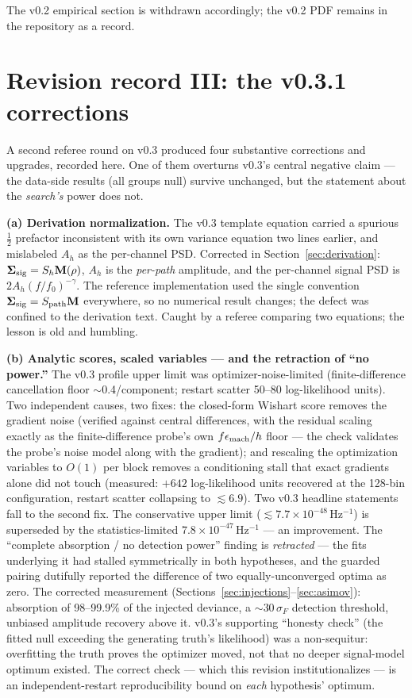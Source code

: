 \documentclass[11pt]{article}
\newcommand{\Ah}{A_h}
\newcommand{\Sh}{S_h}
\begin{document}
The v0.2 empirical section is withdrawn accordingly; the v0.2 PDF remains in the repository as a record.

\section{Revision record III: the v0.3.1 corrections}
\label{app:revision31}

A second referee round on v0.3 produced four substantive corrections and upgrades, recorded here. One of them overturns v0.3's central negative claim --- the data-side results (all groups null) survive unchanged, but the statement about the \emph{search's} power does not.

\textbf{(a) Derivation normalization.} The v0.3 template equation carried a spurious $\tfrac12$ prefactor inconsistent with its own variance equation two lines earlier, and mislabeled $\Ah$ as the per-channel PSD. Corrected in Section~\ref{sec:derivation}: $\bm{\Sigma}_{\rm sig} = \Sh \mathbf{M}(\rho)$, $\Ah$ is the \emph{per-path} amplitude, and the per-channel signal PSD is $2\Ah(f/f_0)^{-\gamma}$. The reference implementation used the single convention $\bm{\Sigma}_{\rm sig} = S_{\rm path}\mathbf{M}$ everywhere, so no numerical result changes; the defect was confined to the derivation text. Caught by a referee comparing two equations; the lesson is old and humbling.

\textbf{(b) Analytic scores, scaled variables --- and the retraction of ``no power.''} The v0.3 profile upper limit was optimizer-noise-limited (finite-difference cancellation floor $\sim$0.4/component; restart scatter 50--80 log-likelihood units). Two independent causes, two fixes: the closed-form Wishart score removes the gradient noise (verified against central differences, with the residual scaling exactly as the finite-difference probe's own $f\epsilon_{\rm mach}/h$ floor --- the check validates the probe's noise model along with the gradient); and rescaling the optimization variables to $O(1)$ per block removes a conditioning stall that exact gradients alone did not touch (measured: $+642$ log-likelihood units recovered at the 128-bin configuration, restart scatter collapsing to $\lesssim 6.9$). Two v0.3 headline statements fall to the second fix. The conservative upper limit ($\lesssim 7.7\times10^{-48}\,\mathrm{Hz^{-1}}$) is superseded by the statistics-limited $7.8\times10^{-47}$$\,\mathrm{Hz^{-1}}$ --- an improvement. The ``complete absorption / no detection power'' finding is \emph{retracted} --- the fits underlying it had stalled symmetrically in both hypotheses, and the guarded pairing dutifully reported the difference of two equally-unconverged optima as zero. The corrected measurement (Sections~\ref{sec:injections}--\ref{sec:asimov}): absorption of 98--99.9\% of the injected deviance, a $\sim$$30\,\sigma_F$ detection threshold, unbiased amplitude recovery above it. v0.3's supporting ``honesty check'' (the fitted null exceeding the generating truth's likelihood) was a non-sequitur: overfitting the truth proves the optimizer moved, not that no deeper signal-model optimum existed. The correct check --- which this revision institutionalizes --- is an independent-restart reproducibility bound on \emph{each} hypothesis' optimum.
\end{document}
